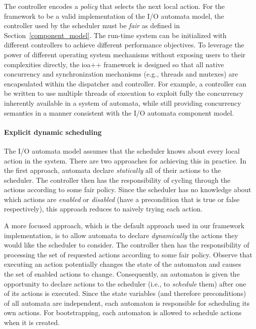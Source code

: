 The controller encodes a \emph{policy} that selects the next local action.
For the framework to be a valid implementation of the I/O automata model, the controller used by the scheduler must be \emph{fair} as defined in Section~\ref{component_model}.
The run-time system can be initialized with different controllers to achieve different performance objectives.
To leverage the power of different operating system mechanisms without exposing users to their complexities directly, the ioa++ framework is designed so that all native concurrency and synchronization mechanisms (e.g., threads and mutexes) are encapsulated within the dispatcher and controller.
For example, a controller can be written to use multiple threads of execution to exploit fully the concurrency inherently available in a system of automata,
while still providing concurrency semantics in a manner consistent with the I/O automata component model.

\paragraph*{Explicit dynamic scheduling}
The I/O automata model assumes that the scheduler knows about every local action in the system.
There are two approaches for achieving this in practice.
In the first approach, automata declare \emph{statically} all of their actions to the scheduler.
The controller then has the responsibility of cycling through the actions according to some fair policy.
Since the scheduler has no knowledge about which actions are \emph{enabled} or \emph{disabled} (have a precondition that is true or false respectively), this approach reduces to naively trying each action.

A more focused approach, which is the default approach used in our framework implementation, is to allow automata to declare \emph{dynamically} the actions they would like the scheduler to consider.
The controller then has the responsibility of processing the set of requested actions according to some fair policy.
Observe that executing an action potentially changes the state of the automaton and causes the set of enabled actions to change.
Consequently, an automaton is given the opportunity to declare actions to the scheduler (i.e., to \emph{schedule} them) after one of its actions is executed.
Since the state variables (and therefore preconditions) of all automata are independent, each automaton is responsible for scheduling its own actions.
For bootstrapping, each automaton is allowed to schedule actions when it is created.


